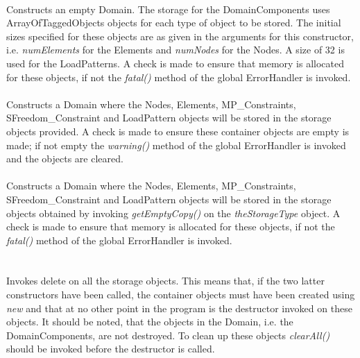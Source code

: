   \\ 
Constructs an empty Domain. The storage for the DomainComponents uses
ArrayOfTaggedObjects objects for each type of object to be stored. The
initial sizes specified for these objects are as given in the
arguments for this constructor, i.e. {\em numElements} for the
Elements and {\em numNodes} for the Nodes. A size of 32 is used for
the LoadPatterns. A check is made to ensure that memory
is allocated for these objects, if not the {\em fatal()} method of the
global ErrorHandler is invoked.\\   


 \\
Constructs a Domain where the Nodes, Elements, MP\_Constraints,
SFreedom\_Constraint and LoadPattern objects will be
stored in the storage objects provided. A check is made to ensure
these container objects are empty is made; if not empty the {\em warning()}
method of the global ErrorHandler is invoked and the objects are
cleared. \\

 \\
Constructs a Domain where the Nodes, Elements, MP\_Constraints,
SFreedom\_Constraint and LoadPattern objects will be stored in the storage
objects obtained by invoking {\em getEmptyCopy()} on the {\em
theStorageType} object. A check is made to ensure that memory is
allocated for these objects, if not the {\em fatal()} method of the
global ErrorHandler is invoked.\\    

  \\
  \\
Invokes delete on all the storage objects. This means that, if the two
latter constructors have been called, the container objects must have 
been created using {\em new} and that at no other point in the program
is the destructor invoked on these objects. It should be noted, that
the objects in the Domain, i.e. the DomainComponents, are not
destroyed. To clean up these objects {\em clearAll()} should be
invoked before the destructor is called. \\

